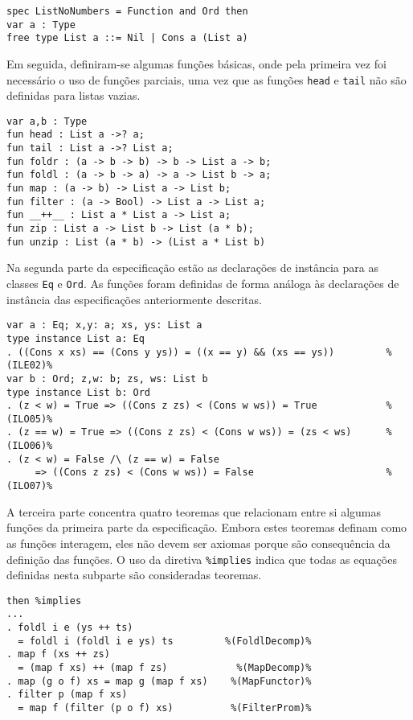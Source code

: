 \begin{Verbatim}
spec ListNoNumbers = Function and Ord then 
var a : Type 
free type List a ::= Nil | Cons a (List a) 
\end{Verbatim}

Em seguida, definiram-se algumas funções básicas, onde pela primeira vez foi necessário o uso de funções parciais, uma vez que as funções \Verb.head. e \Verb.tail. não são definidas para listas vazias.

\begin{Verbatim}
var a,b : Type 
fun head : List a ->? a; 
fun tail : List a ->? List a; 
fun foldr : (a -> b -> b) -> b -> List a -> b; 
fun foldl : (a -> b -> a) -> a -> List b -> a; 
fun map : (a -> b) -> List a -> List b; 
fun filter : (a -> Bool) -> List a -> List a; 
fun __++__ : List a * List a -> List a; 
fun zip : List a -> List b -> List (a * b); 
fun unzip : List (a * b) -> (List a * List b) 
\end{Verbatim}

Na segunda parte da especificação estão as declarações de instância para as classes \Verb.Eq. e \Verb.Ord..
As funções foram definidas de forma análoga às declarações de instância das especificações anteriormente descritas.

\begin{Verbatim}
var a : Eq; x,y: a; xs, ys: List a
type instance List a: Eq
. ((Cons x xs) == (Cons y ys)) = ((x == y) && (xs == ys))         %(ILE02)%
var b : Ord; z,w: b; zs, ws: List b
type instance List b: Ord
. (z < w) = True => ((Cons z zs) < (Cons w ws)) = True            %(ILO05)%
. (z == w) = True => ((Cons z zs) < (Cons w ws)) = (zs < ws)      %(ILO06)%
. (z < w) = False /\ (z == w) = False                             
     => ((Cons z zs) < (Cons w ws)) = False                       %(ILO07)%
\end{Verbatim}

A terceira parte concentra quatro teoremas que relacionam entre si algumas funções da primeira parte da especificação.
Embora estes teoremas definam como as funções interagem, eles não devem ser axiomas porque são consequência da definição das funções.
O uso da diretiva \Verb.%

\begin{Verbatim}
then %implies
...
. foldl i e (ys ++ ts) 
  = foldl i (foldl i e ys) ts         %(FoldlDecomp)% 
. map f (xs ++ zs) 
  = (map f xs) ++ (map f zs)            %(MapDecomp)%
. map (g o f) xs = map g (map f xs)    %(MapFunctor)%
. filter p (map f xs) 
  = map f (filter (p o f) xs)          %(FilterProm)%
\end{Verbatim}

